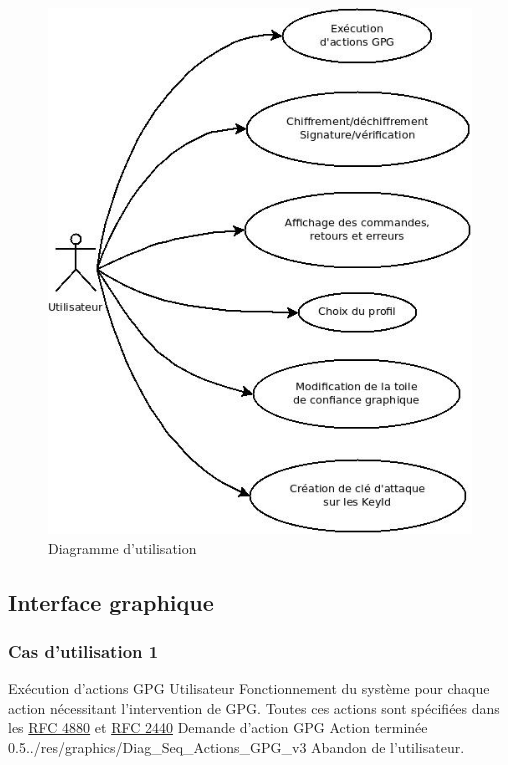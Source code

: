 \documentclass{../res/univ-projet}
\begin{document}
\newpage

\begin{figure}[hb]
 \includegraphics[scale=0.8]{../res/graphics/Diag_utilisations}
 \caption{Diagramme d'utilisation}
\end{figure}

\subsection{Interface graphique}

\subsubsection{Cas d'utilisation 1}
\ficheGraphic
{Exécution d'actions GPG}
{Utilisateur}
{
  Fonctionnement du système pour chaque action nécessitant l'intervention de GPG.
  Toutes ces actions sont spécifiées dans les
  \newline
  \href{http://tools.ietf.org/html/rfc4880}{RFC 4880}
  et \href{http://tools.ietf.org/html/rfc2440}{RFC 2440}
}
{}
{Demande d'action GPG}
{Action terminée}
{0.5}{../res/graphics/Diag_Seq_Actions_GPG_v3}
{Abandon de l'utilisateur.}
\vspace{0.5cm}
\end{document}
